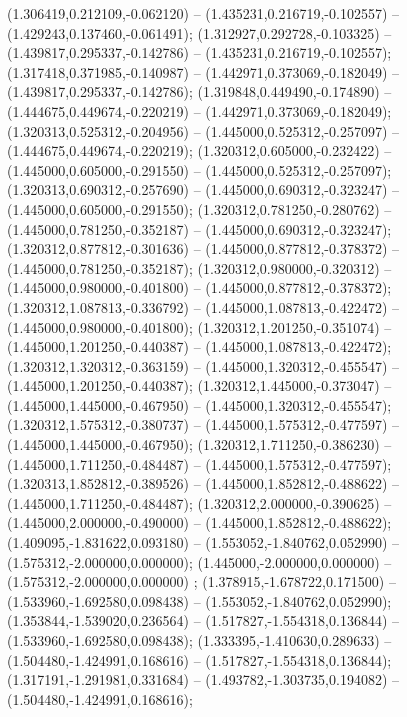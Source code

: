  (1.306419,0.212109,-0.062120) -- (1.435231,0.216719,-0.102557) -- (1.429243,0.137460,-0.061491);
 (1.312927,0.292728,-0.103325) -- (1.439817,0.295337,-0.142786) -- (1.435231,0.216719,-0.102557);
 (1.317418,0.371985,-0.140987) -- (1.442971,0.373069,-0.182049) -- (1.439817,0.295337,-0.142786);
 (1.319848,0.449490,-0.174890) -- (1.444675,0.449674,-0.220219) -- (1.442971,0.373069,-0.182049);
 (1.320313,0.525312,-0.204956) -- (1.445000,0.525312,-0.257097) -- (1.444675,0.449674,-0.220219);
 (1.320312,0.605000,-0.232422) -- (1.445000,0.605000,-0.291550) -- (1.445000,0.525312,-0.257097);
 (1.320313,0.690312,-0.257690) -- (1.445000,0.690312,-0.323247) -- (1.445000,0.605000,-0.291550);
 (1.320312,0.781250,-0.280762) -- (1.445000,0.781250,-0.352187) -- (1.445000,0.690312,-0.323247);
 (1.320312,0.877812,-0.301636) -- (1.445000,0.877812,-0.378372) -- (1.445000,0.781250,-0.352187);
 (1.320312,0.980000,-0.320312) -- (1.445000,0.980000,-0.401800) -- (1.445000,0.877812,-0.378372);
 (1.320312,1.087813,-0.336792) -- (1.445000,1.087813,-0.422472) -- (1.445000,0.980000,-0.401800);
 (1.320312,1.201250,-0.351074) -- (1.445000,1.201250,-0.440387) -- (1.445000,1.087813,-0.422472);
 (1.320312,1.320312,-0.363159) -- (1.445000,1.320312,-0.455547) -- (1.445000,1.201250,-0.440387);
 (1.320312,1.445000,-0.373047) -- (1.445000,1.445000,-0.467950) -- (1.445000,1.320312,-0.455547);
 (1.320312,1.575312,-0.380737) -- (1.445000,1.575312,-0.477597) -- (1.445000,1.445000,-0.467950);
 (1.320312,1.711250,-0.386230) -- (1.445000,1.711250,-0.484487) -- (1.445000,1.575312,-0.477597);
 (1.320313,1.852812,-0.389526) -- (1.445000,1.852812,-0.488622) -- (1.445000,1.711250,-0.484487);
 (1.320312,2.000000,-0.390625) -- (1.445000,2.000000,-0.490000) -- (1.445000,1.852812,-0.488622);
 (1.409095,-1.831622,0.093180) -- (1.553052,-1.840762,0.052990) -- (1.575312,-2.000000,0.000000);
 (1.445000,-2.000000,0.000000) -- (1.575312,-2.000000,0.000000) ;
 (1.378915,-1.678722,0.171500) -- (1.533960,-1.692580,0.098438) -- (1.553052,-1.840762,0.052990);
 (1.353844,-1.539020,0.236564) -- (1.517827,-1.554318,0.136844) -- (1.533960,-1.692580,0.098438);
 (1.333395,-1.410630,0.289633) -- (1.504480,-1.424991,0.168616) -- (1.517827,-1.554318,0.136844);
 (1.317191,-1.291981,0.331684) -- (1.493782,-1.303735,0.194082) -- (1.504480,-1.424991,0.168616);
